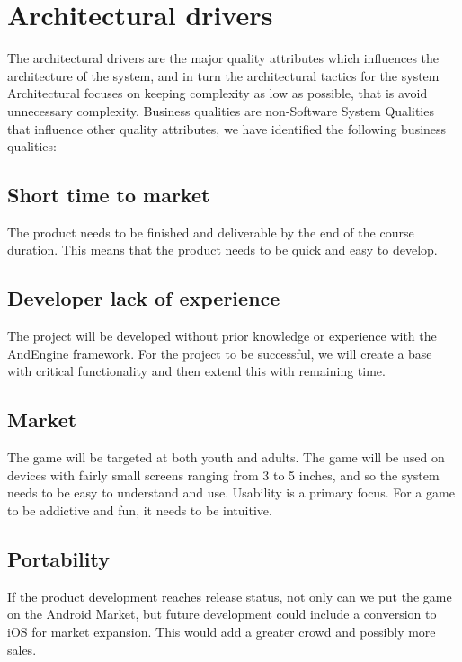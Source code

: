 \chapter{Architectural drivers}
The architectural drivers are the major quality attributes which influences the architecture of the system, and in turn the architectural tactics for the system\cite{pensum}
Architectural focuses on keeping complexity as low as possible, that is avoid unnecessary complexity. 
Business qualities are non-Software System Qualities that influence other quality attributes, we have identified the following business qualities:

\section{Short time to market}
The product needs to be finished and deliverable by the end of the course duration. This means that the product needs to be quick and easy to develop. 

\section{Developer lack of experience}
The project will be developed without prior knowledge or experience with the AndEngine framework\cite{andengine}. For the project to be successful, we will create a base with critical functionality and then extend this with remaining time.

\section{Market}
The game will be targeted at both youth and adults. The game will be used on devices with fairly small screens ranging from 3 to 5 inches, and so the system needs to be easy to understand and use. 
Usability is a primary focus. For a game to be addictive and fun, it needs to be intuitive.

\section{Portability}
If the product development reaches release status, not only can we put the game on the Android Market, but future development could include a conversion to iOS for market expansion. 
This would add a greater crowd and possibly more sales.